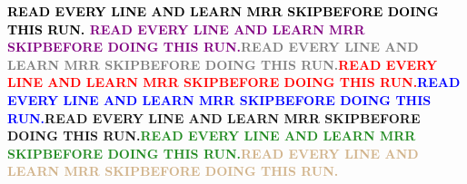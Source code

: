 \vspace*{\fill}
\begin{center}{\Huge \textbf{\textcolor{black}{READ EVERY LINE AND LEARN MRR SKIP\newline BEFORE DOING THIS RUN.} \newline\textcolor{purple}{READ EVERY LINE AND LEARN MRR SKIP\newline BEFORE DOING THIS RUN.}\newline\textcolor{gray}{READ EVERY LINE AND LEARN MRR SKIP\newline BEFORE DOING THIS RUN.}\newline\textcolor{red}{READ EVERY LINE AND LEARN MRR SKIP\newline BEFORE DOING THIS RUN.}\newline\textcolor{blue}{READ EVERY LINE AND LEARN MRR SKIP\newline BEFORE DOING THIS RUN.}\newline\textcolor{BurntOrange}{READ EVERY LINE AND LEARN MRR SKIP\newline BEFORE DOING THIS RUN.}\newline\textcolor{ForestGreen}{READ EVERY LINE AND LEARN MRR SKIP\newline BEFORE DOING THIS RUN.}\newline\textcolor{Tan}{READ EVERY LINE AND LEARN MRR SKIP\newline BEFORE DOING THIS RUN.}} }\end{center}
\vspace*{\fill}
\newpage